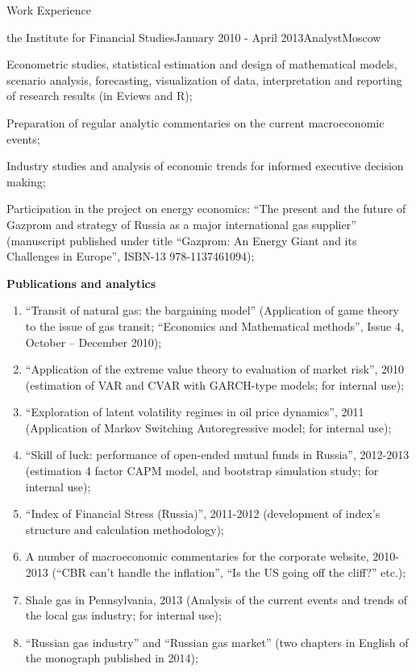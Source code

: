\documentclass{resume} %
\begin{document}
\begin{rSection}{Work Experience}
\begin{rSubsection}{the Institute for Financial Studies}{January 2010 - April 2013}{Analyst}{Moscow}
    \item Econometric studies, statistical estimation and design of mathematical
    models, scenario analysis, forecasting, visualization of data, interpretation and
    reporting of research results (in Eviews and R);
    \item Preparation of regular analytic commentaries on the current macroeconomic
    events;
    \item Industry studies and analysis of economic trends for informed executive
    decision making;
    \item Participation in the project on energy economics: ``The present and the
    future of Gazprom and strategy of Russia as a major international gas supplier''
    (manuscript published under title ``Gazprom: An Energy Giant and its
    Challenges in Europe'', ISBN-13 978-1137461094);
    \item \textbf{Publications and analytics} \begin{enumerate}
        \item ``Transit of natural gas: the bargaining model'' (Application of game
        theory to the issue of gas transit; ``Economics and Mathematical methods'',
        Issue 4, October – December 2010);
        \item ``Application of the extreme value theory to evaluation of market risk'',
        2010 (estimation of VAR and CVAR with GARCH-type models; for internal use);
        \item ``Exploration of latent volatility regimes in oil price dynamics'',
        2011 (Application of Markov Switching Autoregressive model; for internal use);
        \item ``Skill of luck: performance of open-ended mutual funds in Russia'',
        2012-2013 (estimation 4 factor CAPM model, and bootstrap simulation study;
        for internal use);
        \item ``Index of Financial Stress (Russia)'', 2011-2012 (development of index's
        structure and calculation methodology);
        \item A number of macroeconomic commentaries for the corporate website, 2010-2013
        (``CBR can't handle the inflation'', ``Is the US going off the cliff?'' etc.);
        \item Shale gas in Pennsylvania, 2013 (Analysis of the current events and
        trends of the local gas industry; for internal use);
        \item ``Russian gas industry'' and ``Russian gas market'' (two chapters in English
        of the monograph published in 2014);
    \end{enumerate}
\end{rSubsection} \medskip

\end{rSection}
\end{document}
